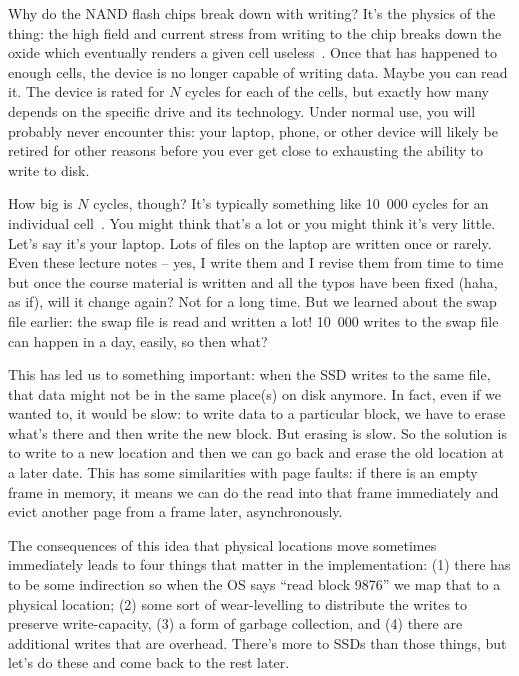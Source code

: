Why do the NAND flash chips break down with writing? It's the physics of the thing: the high field and current stress from writing to the chip breaks down the oxide which eventually renders a given cell useless~\cite{nand-flash}. Once that has happened to enough cells, the device is no longer capable of writing data. Maybe you can read it. The device is rated for $N$ cycles for each of the cells, but exactly how many depends on the specific drive and its technology. Under normal use, you will probably never encounter this: your laptop, phone, or other device will likely be retired for other reasons before you ever get close to exhausting the ability to write to disk.

How big is $N$ cycles, though? It's typically something like 10~000 cycles for an individual cell~\cite{OSTEP}. You might think that's a lot or you might think it's very little. Let's say it's your laptop. Lots of files on the laptop are written once or rarely. Even these lecture notes -- yes, I write them and I revise them from time to time but once the course material is written and all the typos have been fixed (haha, as if), will it change again? Not for a long time. But we learned about the swap file earlier: the swap file is read and written a lot! 10~000 writes to the swap file can happen in a day, easily, so then what? 

This has led us to something important: when the SSD writes to the same file, that data might not be in the same place(s) on disk anymore. In fact, even if we wanted to, it would be slow: to write data to a particular block, we have to erase what's there and then write the new block. But erasing is slow. So the solution is to write to a new location and then we can go back and erase the old location at a later date. This has some similarities with page faults: if there is an empty frame in memory, it means we can do the read into that frame immediately and evict another page from a frame later, asynchronously.


The consequences of this idea that physical locations move sometimes immediately leads to four things that matter in the implementation: (1) there has to be some indirection so when the OS says ``read block 9876'' we map that to a physical location; (2) some sort of wear-levelling to distribute the writes to preserve write-capacity, (3) a form of garbage collection, and (4) there are additional writes that are overhead. There's more to SSDs than those things, but let's do these and come back to the rest later.

